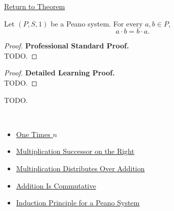 \newpage
{}
\label{prf:multiplication-commutative}

\begin{remark*}[Return]
\hyperref[thm:multiplication-commutative]{Return to Theorem}
\end{remark*}

\begin{theorem*}
Let $(P,S,1)$ be a Peano system. For every $a,b \in P$,
\[
a \cdot b = b \cdot a.
\]
\end{theorem*}

\begin{proof}
\textbf{Professional Standard Proof.}~\\
TODO.
\end{proof}

\begin{proof}
\textbf{Detailed Learning Proof.}~\\
TODO.
\end{proof}

\begin{remark*}
TODO.
\end{remark*}

\begin{remark*}[Dependencies]~\\
\begin{itemize}
  \item \hyperref[thm:one-times-n]{One Times $n$}
  \item \hyperref[thm:multiplication-successor-on-right]{Multiplication Successor on the Right}
  \item \hyperref[thm:multiplication-distributes-over-addition]{Multiplication Distributes Over Addition}
  \item \hyperref[thm:addition-commutative]{Addition Is Commutative}
  \item \hyperref[thm:induction-principle-for-peano-system]{Induction Principle for a Peano System}
\end{itemize}
\end{remark*}
